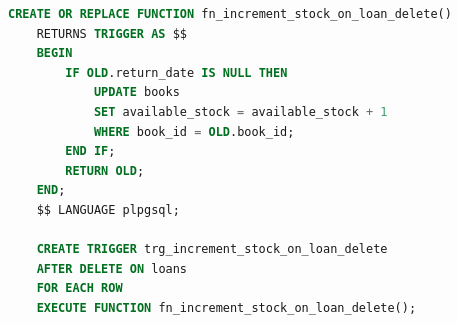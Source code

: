 \documentclass[11pt, a4paper]{article}
\begin{document}
\begin{lstlisting}[language=SQL, style=sqlstyle, caption={personal\_library/schema.sql SQL脚本}, label={lst:schema_sql}]
    CREATE OR REPLACE FUNCTION fn_increment_stock_on_loan_delete()
    RETURNS TRIGGER AS $$
    BEGIN
        IF OLD.return_date IS NULL THEN
            UPDATE books
            SET available_stock = available_stock + 1
            WHERE book_id = OLD.book_id;
        END IF;
        RETURN OLD;
    END;
    $$ LANGUAGE plpgsql;
    
    CREATE TRIGGER trg_increment_stock_on_loan_delete
    AFTER DELETE ON loans
    FOR EACH ROW
    EXECUTE FUNCTION fn_increment_stock_on_loan_delete();
    
\end{lstlisting}


\end{document}
